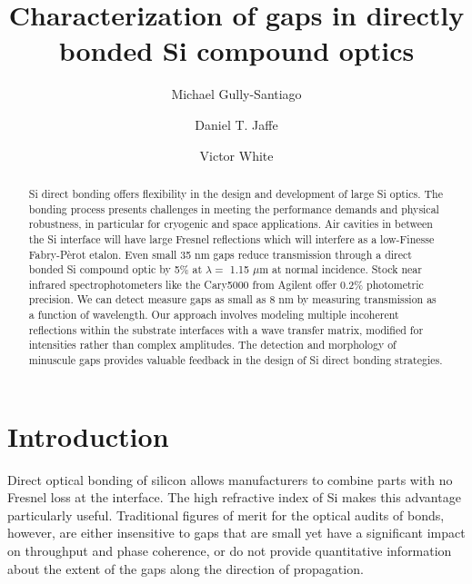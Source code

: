 \documentclass[osajnl,preprint,showpacs,superscriptaddress,12pt]{revtex4-1} %
\begin{document}
\title{Characterization of gaps in directly bonded Si compound optics}

\author{Michael Gully-Santiago}
\author{Daniel T. Jaffe}

\author{Victor White}


\begin{abstract}
Si direct bonding offers flexibility in the design and development of large Si optics.  The bonding process presents challenges in meeting the performance demands and physical robustness, in particular for cryogenic and space applications.  Air cavities in between the Si interface will have large Fresnel reflections which will interfere as a low-Finesse Fabry-P\`erot etalon.  Even small 35 nm gaps reduce transmission through a direct bonded Si compound optic by 5\% at $\lambda = $ 1.15 $\mu$m at normal incidence.  Stock near infrared spectrophotometers like the Cary5000 from Agilent offer 0.2\% photometric precision.  We can detect measure gaps as small as 8 nm by measuring transmission as a function of wavelength.  Our approach involves modeling multiple incoherent reflections within the substrate interfaces with a wave transfer matrix, modified for intensities rather than complex amplitudes.  The detection and morphology of minuscule gaps provides valuable feedback in the design of Si direct bonding strategies.
\end{abstract}


\maketitle %

\section{Introduction}


Direct optical bonding of silicon allows manufacturers to combine parts with no Fresnel loss at the interface.  The high refractive index of Si makes this advantage particularly useful.  Traditional figures of merit for the optical audits of bonds, however, are either insensitive to gaps that are small yet have a significant impact on throughput and phase coherence, or do not provide quantitative information about the extent of the gaps along the direction of propagation.
\end{document}
